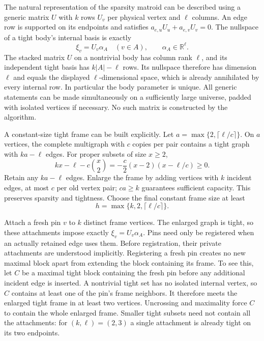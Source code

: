 \documentclass[11pt,a4paper]{article}
\theoremstyle{definition}
\theoremstyle{remark}
\begin{document}
The natural representation of the sparsity matroid
\cite{natural} can be described using a generic matrix
$U$ with $k$ rows $U_v$ per physical vertex and $\ell$ columns.
An edge row is supported on its endpoints and satisfies
$a_{e,u}U_u+a_{e,v}U_v=0$.
The nullspace of a tight body's internal basis is exactly
\begin{equation}\label{eq:motions}
 \xi_v=U_v\alpha_A\quad(v\in A),
 \qquad \alpha_A\in\mathbb R^\ell.
\end{equation}
The stacked matrix $U$ on a nontrivial body has column rank
$\ell$, and its independent tight basis has $k|A|-\ell$ rows.
Its nullspace therefore has dimension $\ell$ and equals the
displayed $\ell$-dimensional space, which is already annihilated
by every internal row. In particular the body parameter is unique.
All generic statements can be made simultaneously on a
sufficiently large universe, padded with isolated vertices
if necessary. No such matrix is constructed by the algorithm.

A constant-size tight frame can be built explicitly.
Let $a=\max\{2,\lceil\ell/c\rceil\}$.
On $a$ vertices, the complete multigraph with $c$ copies
per pair contains a tight graph with $ka-\ell$ edges.
For proper subsets of size $x\geq2$,
\[
 kx-\ell-c\binom{x}{2}
 =-\frac c2(x-2)(x-\ell/c)\geq0.
\]
Retain any $ka-\ell$ edges. Enlarge the frame by adding
vertices with $k$ incident edges, at most $c$ per old
vertex pair; $ca\geq k$ guarantees sufficient capacity.
This preserves sparsity and tightness.
Choose the final constant frame size at least
\begin{equation}\label{eq:frame-width}
 h=\max\{k,2,\lceil\ell/c\rceil\}.
\end{equation}

Attach a fresh pin $v$ to $k$ distinct frame vertices.
The enlarged graph is tight, so these attachments impose
exactly $\xi_v=U_v\alpha_A$. Pins need only be registered
when an actually retained edge uses them. Before registration,
their private attachments are understood implicitly.
Registering a fresh pin creates no new maximal block
apart from extending the block containing its frame.
To see this, let $C$ be a maximal tight block containing the
fresh pin before any additional incident edge is inserted.
A nontrivial tight set has no isolated internal vertex, so $C$
contains at least one of the pin's frame neighbors. It therefore
meets the enlarged tight frame in at least two vertices.
Uncrossing and maximality force $C$ to contain the whole enlarged
frame. Smaller tight subsets need not contain all the attachments:
for $(k,\ell)=(2,3)$ a single attachment is already tight on its
two endpoints.
\end{document}
